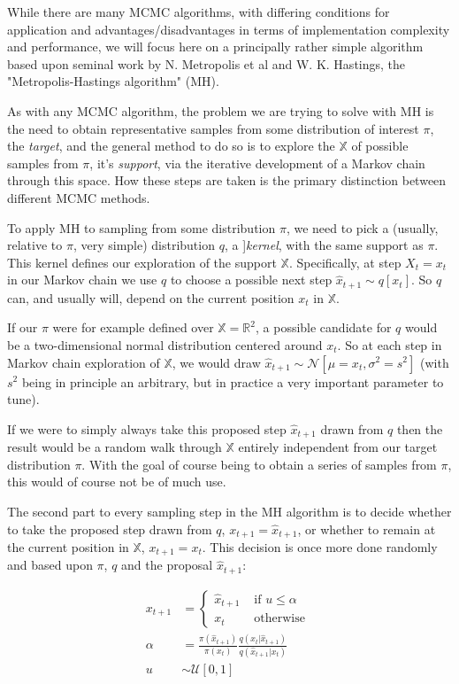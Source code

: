 While there are many MCMC algorithms, with differing conditions for application and advantages/disadvantages in terms of implementation complexity and performance, we will focus here on a principally rather simple algorithm based upon seminal work by N. Metropolis et al and W. K. Hastings, the "Metropolis-Hastings algorithm" (MH).

As with any MCMC algorithm, the problem we are trying to solve with MH is the need to obtain representative samples from some distribution of interest $\pi$, the \textit{target}, and the general method to do so is to explore the $\mathbb{X}$ of possible samples from $\pi$, it's \textit{support}, via the iterative development of a Markov chain through this space. How these steps are taken is the primary distinction between different MCMC methods.

To apply MH to sampling from some distribution $\pi$, we need to pick a (usually, relative to $\pi$, very simple) distribution $q$, a ]\textit{kernel}, with the same support as $\pi$. This kernel defines our exploration of the support $\mathbb{X}$. Specifically, at step $X_t = x_t$ in our Markov chain we use $q$ to choose a possible next step $\hat{x}_{t+1} \sim q[x_t]$. So $q$ can, and usually will, depend on the current position $x_t$ in $\mathbb{X}$.

If our $\pi$ were for example defined over $\mathbb{X} = \mathbb{R}^2$, a possible candidate for $q$ would be a two-dimensional normal distribution centered around $x_t$. So at each step in Markov chain exploration of $\mathbb{X}$, we would draw $\hat{x}_{t+1} \sim \mathcal{N}[\mu = x_t, \sigma^2 = s^2]$ (with $s^2$ being in principle an arbitrary, but in practice a very important parameter to tune).

If we were to simply always take this proposed step $\hat{x}_{t+1}$ drawn from $q$ then the result would be a random walk through $\mathbb{X}$ entirely independent from our target distribution $\pi$. With the goal of course being to obtain a series of samples from $\pi$, this would of course not be of much use.

The second part to every sampling step in the MH algorithm is to decide whether to take the proposed step drawn from $q$, $x_{t+1} = \hat{x}_{t+1}$, or whether to remain at the current position in $\mathbb{X}$, $x_{t+1} = x_{t}$. This decision is once more done randomly and based upon $\pi$, $q$ and the proposal $\hat{x}_{t+1}$:

\begin{align*}
x_{t+1} & = \begin{cases}
    \hat{x}_{t+1} & \text{ if } u \le \alpha \\
            x_{t} & \text{ otherwise }
            \end{cases} \\
\alpha & = \frac{\pi(\hat{x}_{t+1})}{\pi(x_t)} \frac{q(x_t | \hat{x}_{t+1})}{q(\hat{x}_{t+1} | x_t)} \\
u & \sim \mathcal{U}[0,1]
\end{align*}

